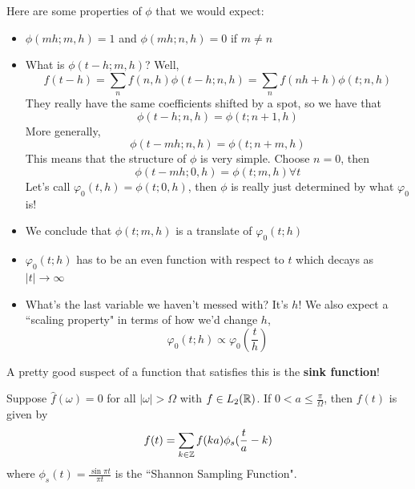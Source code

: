 \documentclass{article}
\begin{document}
Here are some properties of $\phi$ that we would expect:
\begin{itemize}
    \item $\phi(mh; m, h) = 1$ and $\phi(mh; n, h) = 0$ if $m \neq n$
    \item What is $\phi(t - h; m, h)$? Well,
    \[f(t - h) = \sum_n f(n, h) \phi(t - h; n, h) = \sum_n f(n h + h) \phi(t; n, h)\]
    They really have the same coefficients shifted by a spot, so we have that
    \[\phi(t - h; n, h) = \phi(t; n+1, h)\]
    More generally,
    \[\phi(t - mh; n, h) = \phi(t; n + m, h)\]
    This means that the structure of $\phi$ is very simple. Choose $n = 0$, then
    \[\phi(t - mh; 0, h) = \phi(t; m, h) \forall t\]
    Let's call $\varphi_0(t, h) = \phi(t; 0, h)$, then $\phi$ is really just determined by what $\varphi_0$ is!
    \item We conclude that $\phi(t; m, h)$ is a translate of $\varphi_0(t; h)$
    \item $\varphi_0(t; h)$ has to be an even function with respect to $t$ which decays as $|t| \to \infty$
    \item What's the last variable we haven't messed with? It's $h$! We also expect a ``scaling property" in terms of how we'd change $h$,
    \[\varphi_0(t; h) \propto \varphi_0(\frac{t}{h})\]
\end{itemize}

A pretty good suspect of a function that satisfies this is the \textbf{sink function}!

\begin{theorem}
    Suppose $\widehat{f}(\omega) = 0$ for all $|\omega| > \Omega$ with $f \in L_2(\mathbb{R})$. If $0 < a \leq \frac{\pi}{\Omega}$, then $f(t)$ is given by
    \[f(t) = \sum_{k \in \mathbb{Z}} f(ka) \phi_s(\frac{t}{a} - k)\]
    where $\phi_s(t) = \frac{\sin \pi t }{\pi t}$ is the ``Shannon Sampling Function".
\end{theorem}
\end{document}
